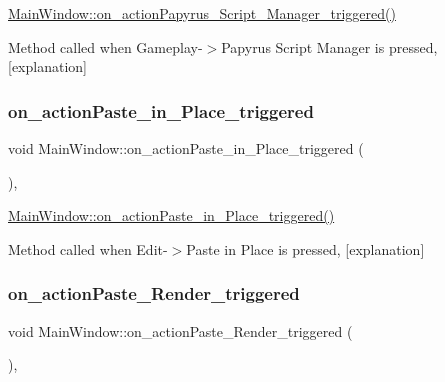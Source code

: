 \hyperlink{class_main_window_aff1e2e1ceb8705f368c624cec0407c12}{Main\+Window\+::on\+\_\+action\+Papyrus\+\_\+\+Script\+\_\+\+Manager\+\_\+triggered()} 

Method called when Gameplay-\/$>$Papyrus Script Manager is pressed, \mbox{[}explanation\mbox{]} \mbox{\label{class_main_window_a675facd954ba9ceb4af6b3496a7db66e}} 
\subsubsection{\texorpdfstring{on\+\_\+action\+Paste\+\_\+in\+\_\+\+Place\+\_\+triggered}{on\_actionPaste\_in\_Place\_triggered}}
{\footnotesize\ttfamily void Main\+Window\+::on\+\_\+action\+Paste\+\_\+in\+\_\+\+Place\+\_\+triggered (\begin{DoxyParamCaption}{ }\end{DoxyParamCaption})\hspace{0.3cm}{\ttfamily [private]}, {\ttfamily [slot]}}



\hyperlink{class_main_window_a675facd954ba9ceb4af6b3496a7db66e}{Main\+Window\+::on\+\_\+action\+Paste\+\_\+in\+\_\+\+Place\+\_\+triggered()} 

Method called when Edit-\/$>$Paste in Place is pressed, \mbox{[}explanation\mbox{]} \mbox{\label{class_main_window_a8587cd1f94682b6ac53b321b632e1220}} 
\subsubsection{\texorpdfstring{on\+\_\+action\+Paste\+\_\+\+Render\+\_\+triggered}{on\_actionPaste\_Render\_triggered}}
{\footnotesize\ttfamily void Main\+Window\+::on\+\_\+action\+Paste\+\_\+\+Render\+\_\+triggered (\begin{DoxyParamCaption}{ }\end{DoxyParamCaption})\hspace{0.3cm}{\ttfamily [private]}, {\ttfamily [slot]}}



